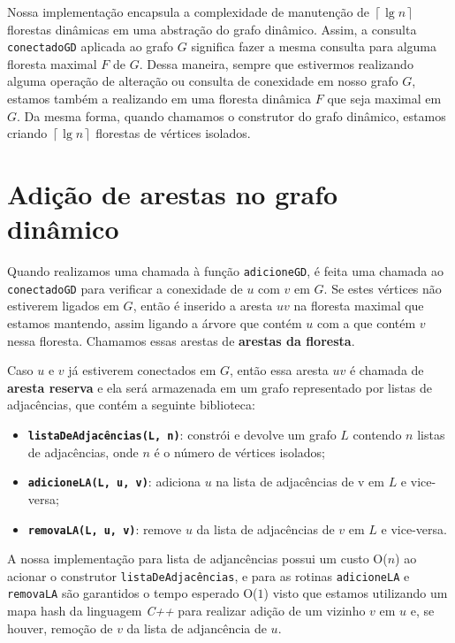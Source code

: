 Nossa implementação encapsula a complexidade de manutenção de $\left\lceil \lg n \right\rceil$ florestas dinâmicas em uma abstração do grafo dinâmico. 
Assim, a consulta \texttt{conectadoGD} aplicada ao grafo $G$ significa fazer a mesma consulta para alguma floresta maximal $F$ de $G$. Dessa maneira, sempre que estivermos realizando alguma operação de alteração ou consulta de conexidade em nosso grafo $G$, estamos também a realizando em uma floresta dinâmica $F$ que seja maximal em $G$. Da mesma forma, quando chamamos o construtor do grafo dinâmico, estamos criando $\left\lceil \lg n \right\rceil$ florestas de vértices isolados.

\section{Adição de arestas no grafo dinâmico}

Quando realizamos uma chamada à função \texttt{adicioneGD}, é feita uma chamada ao \texttt{conectadoGD} para verificar a conexidade de $u$ com $v$ em $G$. Se estes vértices não estiverem ligados em $G$, então é inserido a aresta $uv$ na floresta maximal que estamos mantendo, assim ligando a árvore que contém $u$ com a que contém $v$ nessa floresta. Chamamos essas arestas de \textbf{arestas da floresta}.

Caso $u$ e $v$ já estiverem conectados em $G$, então essa aresta $uv$ é chamada de \textbf{aresta reserva} e ela será armazenada em um grafo representado por listas de adjacências, que contém a seguinte biblioteca:

\begin{itemize}
    \item \texttt{\textbf{listaDeAdjacências(L, n)}}: constrói e devolve um grafo $L$ contendo $n$ listas de adjacências, onde $n$ é o número de vértices isolados;
    \item \texttt{\textbf{adicioneLA(L, u, v)}}: adiciona $u$ na lista de adjacências de v em $L$ e vice-versa;
    \item \texttt{\textbf{removaLA(L, u, v)}}: remove $u$ da lista de adjacências de $v$ em $L$ e vice-versa.
\end{itemize} 

A nossa implementação \cite{chung2025} para lista de adjancências possui um custo O($n$) ao acionar o construtor \texttt{listaDeAdjacências}, e para 
as rotinas \texttt{adicioneLA} e \texttt{removaLA} são garantidos o tempo esperado O($1$) visto que estamos utilizando um mapa hash da linguagem \textit{C++} para realizar adição de um vizinho $v$ em $u$ e, se houver, remoção de $v$ da lista de adjancência de $u$.

